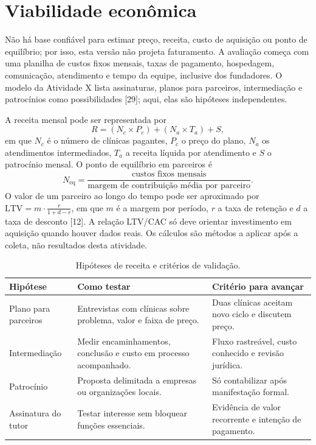 \section{Viabilidade econômica}

Não há base confiável para estimar preço, receita, custo de aquisição ou ponto de equilíbrio; por isso, esta versão não projeta faturamento. A avaliação começa com uma planilha de custos fixos mensais, taxas de pagamento, hospedagem, comunicação, atendimento e tempo da equipe, inclusive dos fundadores. O modelo da Atividade X lista assinaturas, planos para parceiros, intermediação e patrocínios como possibilidades [29]; aqui, elas são hipóteses independentes.

A receita mensal pode ser representada por
\[
R = (N_c \times P_c) + (N_a \times T_a) + S,
\]
em que $N_c$ é o número de clínicas pagantes, $P_c$ o preço do plano, $N_a$ os atendimentos intermediados, $T_a$ a receita líquida por atendimento e $S$ o patrocínio mensal. O ponto de equilíbrio em parceiros é
\[
N_{\text{eq}} = \frac{\text{custos fixos mensais}}{\text{margem de contribuição média por parceiro}}.
\]
O valor de um parceiro ao longo do tempo pode ser aproximado por $\text{LTV} = m \cdot \frac{r}{1 + d - r}$, em que $m$ é a margem por período, $r$ a taxa de retenção e $d$ a taxa de desconto [12]. A relação LTV/CAC só deve orientar investimento em aquisição quando houver dados reais. Os cálculos são métodos a aplicar após a coleta, não resultados desta atividade.

\begin{table}[H]
\centering\small
\caption{Hipóteses de receita e critérios de validação.}
\begin{tabularx}{\textwidth}{P{2.8cm}YY}
\toprule
\textbf{Hipótese} & \textbf{Como testar} & \textbf{Critério para avançar} \\
\midrule
Plano para parceiros & Entrevistas com clínicas sobre problema, valor e faixa de preço. & Duas clínicas aceitam novo ciclo e discutem preço. \\
Intermediação & Medir encaminhamentos, conclusão e custo em processo acompanhado. & Fluxo rastreável, custo conhecido e revisão jurídica. \\
Patrocínio & Proposta delimitada a empresas ou organizações locais. & Só contabilizar após manifestação formal. \\
Assinatura do tutor & Testar interesse sem bloquear funções essenciais. & Evidência de valor recorrente e intenção de pagamento. \\
\bottomrule
\end{tabularx}
\end{table}
